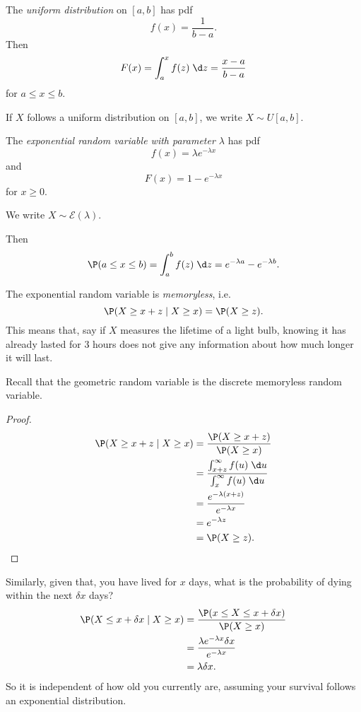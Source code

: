 \documentclass[a4paper]{article}
\begin{document}
\begin{defi}
  The \emph{uniform distribution} on $[a, b]$ has pdf
  \[
    f(x) = \frac{1}{b - a}.
  \]
  Then
  \[
    F(x) = \int_a^x f(z)\;\d z = \frac{x - a}{b - a}
  \]
  for $a \leq x \leq b$.

  If $X$ follows a uniform distribution on $[a, b]$, we write $X\sim U[a, b]$.
\end{defi}
\begin{defi}
  The \emph{exponential random variable with parameter $\lambda$} has pdf
  \[
    f(x) = \lambda e^{-\lambda x}
  \]
  and
  \[
    F(x) = 1 - e^{-\lambda x}
  \]
  for $x \geq 0$.

  We write $X \sim \mathcal{E}(\lambda)$.
\end{defi}

Then
\[
  \P(a \leq x \leq b) = \int_a^b f(z) \;\d z = e^{-\lambda a} - e^{-\lambda b}.
\]
\begin{prop}
  The exponential random variable is \emph{memoryless}, i.e.
  \[
    \P(X \geq x + z \mid X \geq x) = \P(X \geq z).
  \]
  This means that, say if $X$ measures the lifetime of a light bulb, knowing it has already lasted for 3 hours does not give any information about how much longer it will last.
\end{prop}
Recall that the geometric random variable is the discrete memoryless random variable.

\begin{proof}
  \begin{align*}
    \P(X \geq x + z \mid X \geq x) &= \frac{\P(X \geq x + z)}{\P(X \geq x)}\\
    &= \frac{\int_{x + z}^\infty f(u)\;\d u}{\int_x^\infty f(u)\;\d u}\\
    &= \frac{e^{-\lambda(x + z)}}{e^{-\lambda x}}\\
    &= e^{-\lambda z}\\
    &= \P(X \geq z).\qedhere
  \end{align*}
\end{proof}

Similarly, given that, you have lived for $x$ days, what is the probability of dying within the next $\delta x$ days?
\begin{align*}
  \P(X \leq x + \delta x \mid X \geq x) &= \frac{\P(x \leq X \leq x + \delta x)}{\P(X \geq x)}\\
  &= \frac{\lambda e^{-\lambda x} \delta x}{e^{-\lambda x}}\\
  &= \lambda \delta x.
\end{align*}
So it is independent of how old you currently are, assuming your survival follows an exponential distribution.
\end{document}
